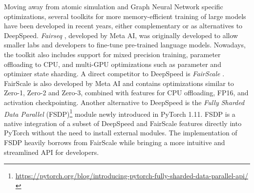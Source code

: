 Moving away from atomic simulation and Graph Neural Network specific optimizations, several 
toolkits for more memory-efficient training of large models have been developed 
in recent years, either complementary or as alternatives to DeepSpeed. \textit{Fairseq} \cite*{ott2019fairseq}, 
developed by Meta AI, was originally developed to allow smaller labs and developers to 
fine-tune pre-trained language models. Nowadays, the toolkit also includes support for mixed 
precision training, parameter offloading to CPU, and multi-GPU optimizations such as parameter and 
optimizer state sharding. A direct competitor to DeepSpeed is \textit{FairScale} \cite*{FairScale2021}. 
FairScale is also developed by Meta AI and contains optimizations similar to Zero-1, Zero-2 and 
Zero-3, combined with features for CPU offloading, FP16, and activation checkpointing. Another 
alternative to DeepSpeed is the \textit{Fully Sharded Data Parallel} (FSDP)\footnote{\url{https://pytorch.org/blog/introducing-pytorch-fully-sharded-data-parallel-api/}} 
module newly introduced in PyTorch 1.11. FSDP is a native integration of a subset of DeepSpeed 
and FairScale features directly into PyTorch without the need to install external modules. 
The implementation of FSDP heavily borrows from FairScale while bringing a more intuitive and 
streamlined API for developers.


